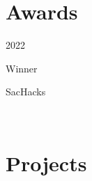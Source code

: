 \documentclass[]{deedy-resume-openfont}
\begin{document}
\begin{minipage}[t]{0.33\textwidth}
\section{Awards} 
\begin{awards}
\begin{year_start}2022\end{year_start} \begin{position}Winner\end{position} \begin{award}SacHacks\end{award}\\
\end{awards}
\sectionsep

%
%

\end{minipage} 
\hfill
\begin{minipage}[t]{0.66\textwidth}
\section{Projects}
\sectionsep



\end{minipage} 
\end{document}
